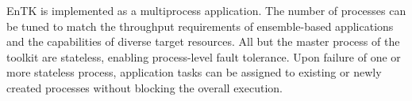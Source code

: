 EnTK is implemented as a multiprocess application. The number of processes
can be tuned to match the throughput requirements of ensemble-based
applications and the capabilities of diverse target resources. All but the
master process of the toolkit are stateless, enabling process-level fault
tolerance. Upon failure of one or more stateless process, application tasks
can be assigned to existing or newly created processes without blocking the
overall execution.



